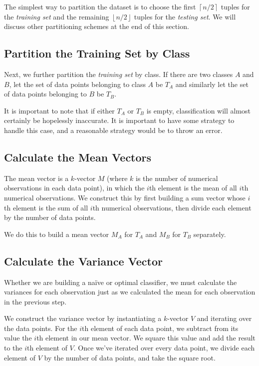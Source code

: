 \documentclass{article}
\newcommand{\floor}[1]{\left\lfloor#1\right\rfloor}
\newcommand{\ceil}[1]{\left\lceil#1\right\rceil}
\begin{document}
The simplest way to partition the dataset is to choose the first
$\ceil{n/2}$ tuples for the \emph{training set} and the remaining
$\floor{n/2}$ tuples for the \emph{testing set}.  We will discuss
other partitioning schemes at the end of this section.

\subsection{Partition the Training Set by Class}

Next, we further partition the \emph{training set} by class.  If there
are two classes $A$ and $B$, let the set of data points belonging to
class $A$ be $T_A$ and similarly let the set of data points belonging
to $B$ be $T_B$.

It is important to note that if either $T_A$ or $T_B$ is empty,
classification will almost certainly be hopelessly inaccurate.  It is
important to have some strategy to handle this case, and a reasonable
strategy would be to throw an error.

\subsection{Calculate the Mean Vectors}

The mean vector is a $k$-vector $M$ (where $k$ is the number of
numerical observations in each data point), in which the $i$th element
is the mean of all $i$th numerical observations.  We construct this by
first building a sum vector whose $i$th element is the sum of all
$i$th numerical observations, then divide each element by the number
of data points.

We do this to build a mean vector $M_A$ for $T_A$ and $M_B$ for $T_B$
separately.

\subsection{Calculate the Variance Vector}

Whether we are building a na\"ive or optimal classifier, we must
calculate the variances for each observation just as we calculated the
mean for each observation in the previous step.

We construct the variance vector by instantiating a $k$-vector $V$ and
iterating over the data points.  For the $i$th element of each data
point, we subtract from its value the $i$th element in our mean
vector.  We square this value and add the result to the $i$th element
of $V$.  Once we've iterated over every data point, we divide each
element of $V$ by the number of data points, and take the square root.
\end{document}
